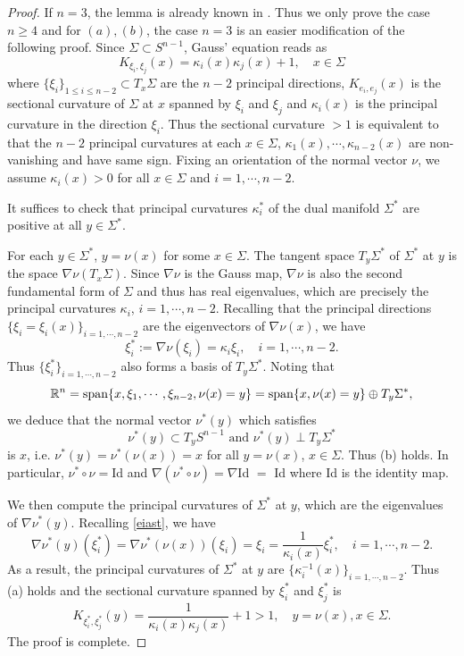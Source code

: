 \documentclass[11pt,a4paper,reqno]{amsart}
\newcommand{\R}{\mathbb{R}}
\newcommand{\1}{\mathbf{1}}
\numberwithin{equation}{section}
\theoremstyle{plain}
\theoremstyle{definition}
\theoremstyle{remark}
\begin{document}
\begin{proof}
   If $n=3$, the lemma is already known in \cite[Page 9]{gan2024}. Thus we only prove the case $n\ge 4$ and for $(a),(b)$, the case $n=3$ is an easier modification of the following proof. Since $\Sigma \subset S^{n-1}$, Gauss' equation reads as
   $$ K_{\xi_i,\xi_j}(x) = \kappa_{i}(x) \kappa_{j}(x) + 1 ,\quad x \in \Sigma  $$
  where $\{\xi_i\}_{1 \le i\le n-2} \subset T_x\Sigma$ are the $n-2$ principal directions,
  $K_{e_i,e_j}(x)$ is the sectional curvature of $\Sigma$ at $x$ spanned by $\xi_i$ and $\xi_j$ and $\kappa_{i}(x)$ is the principal curvature in the direction $\xi_i$. Thus the sectional curvature $>1$ is equivalent to that the $n-2$ principal curvatures at each $x \in \Sigma$, $\kappa_1(x), \cdots, \kappa_{n-2}(x)$ are non-vanishing and have same sign. Fixing an orientation of the normal vector $\nu$, we assume $\kappa_i(x)>0$ for all $x \in \Sigma$ and $i=1, \cdots, n-2$.

  It suffices to check that principal curvatures $\kappa_i^\ast$ of the dual manifold $\Sigma^\ast$ are positive at all $y \in \Sigma^\ast$.

  For each $y \in \Sigma^\ast$, $y=\nu(x)$ for some $x \in \Sigma$.
  The tangent space $T_y\Sigma^\ast$ of $\Sigma^\ast$ at $y$ is the space $\nabla \nu(T_x\Sigma)$. Since $\nabla \nu$ is the Gauss map, $\nabla \nu$ is also the second fundamental form of $\Sigma$ and thus has real eigenvalues, which are precisely the principal curvatures $\kappa_i$, $i=1,\cdots ,n-2$. Recalling that the principal directions
  $\{\xi_i=\xi_i(x)\}_{i=1, \cdots,n-2}$ are the eigenvectors of $\nabla \nu(x)$, we have
  \begin{equation}\label{eiast}
    \xi_i^\ast:= \nabla \nu(\xi_i) = \kappa_i \xi_i, \quad i=1, \cdots,n-2.
  \end{equation}
  Thus $\{\xi_i^\ast\}_{i=1, \cdots,n-2}$ also forms a basis of $T_y\Sigma^\ast$.
  Noting that
  $$ \R^n= {\rm span} \{x, \xi_1, \cdots, \xi_{n-2}, \nu(x)=y\} ={\rm span} \{x, \nu(x)=y\} \oplus T_y\Sigma^\ast,  $$
  we deduce that
  the normal vector $\nu^\ast(y)$ which satisfies
   $$\nu^\ast(y)\subset T_{y} S^{n-1} \mbox{ and } \nu^\ast(y) \perp T_{y}\Sigma^\ast$$
   is $x$, i.e. $\nu^\ast(y) = \nu^\ast(\nu(x)) = x$ for all $y = \nu(x)$, $x \in \Sigma$. Thus (b) holds.
   In particular, $\nu^\ast \circ \nu =$Id and $\nabla(\nu^\ast \circ \nu) = \nabla $Id $=$ Id where Id is the identity map.

   We then compute the principal curvatures of $\Sigma^\ast$ at $y$, which are the eigenvalues of $\nabla\nu^\ast(y)$.
   Recalling \eqref{eiast}, we have
   $$ \nabla\nu^\ast(y)(\xi_i^\ast) = \nabla\nu^\ast(\nu(x))(\xi_i) =\xi_i = \frac{1}{\kappa_i(x)}\xi_i^\ast, \quad i=1, \cdots,n-2.$$
   As a result,
   the principal curvatures of $\Sigma^\ast$ at $y$ are $\{\kappa_i^{-1}(x)\}_{i=1, \cdots,n-2}$. Thus (a) holds and the sectional curvature spanned by $\xi_i^\ast$ and $\xi_j^\ast$ is
   $$K_{\xi_i^\ast,\xi_j^\ast}(y) = \frac1{\kappa_{i}(x) \kappa_{j}(x) }+ 1 >1 ,\quad y=\nu(x), x \in \Sigma. $$
   The proof is complete.
\end{proof}
\end{document}
